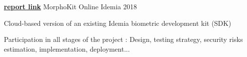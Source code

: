 \documentclass[11pt, a4paper]{awesome-cv}
\begin{document}
\begin{cventries}
  \cventry
  {\href{https://drive.google.com/open?id=1q9ahp9iRNREYmjb1pVUp9wJLECDwfH35}{\textbf{report link}}}
  {MorphoKit Online}
  {Idemia}
  {2018}
  {
    \begin{cvitems}
      \item Cloud-based version of an existing Idemia biometric development kit (SDK)
      \item Participation in all stages of the project : Design, testing strategy, security risks estimation, implementation, deployment...
    \end{cvitems}
  }

\end{cventries}
\end{document}

